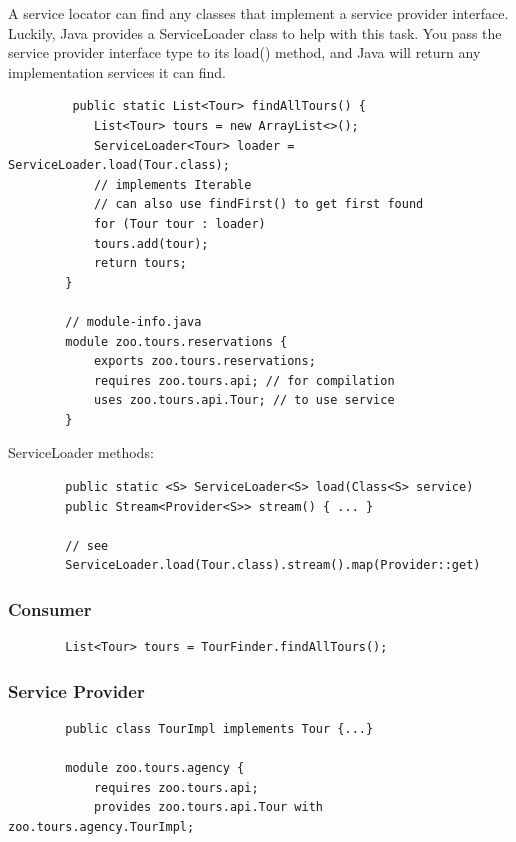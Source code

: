 \documentclass{scrartcl}
\begin{document}
    A service locator can find any classes that implement a service provider interface.
    Luckily, Java provides a ServiceLoader class to help with this task. You pass the service provider interface type to its load() method, and Java will return any implementation services it can find.

    \begin{lstlisting}
         public static List<Tour> findAllTours() {
            List<Tour> tours = new ArrayList<>();
            ServiceLoader<Tour> loader = ServiceLoader.load(Tour.class);
            // implements Iterable
            // can also use findFirst() to get first found
            for (Tour tour : loader)
            tours.add(tour);
            return tours;
        }

        // module-info.java
        module zoo.tours.reservations {
            exports zoo.tours.reservations;
            requires zoo.tours.api; // for compilation
            uses zoo.tours.api.Tour; // to use service
        }
    \end{lstlisting}

    ServiceLoader methods:

    \begin{lstlisting}
        public static <S> ServiceLoader<S> load(Class<S> service)
        public Stream<Provider<S>> stream() { ... }

        // see
        ServiceLoader.load(Tour.class).stream().map(Provider::get)
    \end{lstlisting}

\subsubsection{Consumer}

    \begin{lstlisting}
        List<Tour> tours = TourFinder.findAllTours();
    \end{lstlisting}


\subsubsection{Service Provider}

    \begin{lstlisting}
        public class TourImpl implements Tour {...}

        module zoo.tours.agency {
            requires zoo.tours.api;
            provides zoo.tours.api.Tour with zoo.tours.agency.TourImpl;
    \end{lstlisting}
\end{document}
